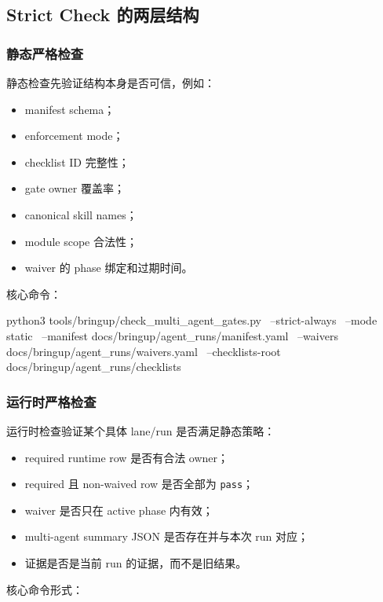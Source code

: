 \documentclass[UTF8,11pt,a4paper]{ctexart}
\begin{document}
\subsection{Strict Check 的两层结构}

\subsubsection{静态严格检查}

静态检查先验证结构本身是否可信，例如：

\begin{itemize}
  \item manifest schema；
  \item enforcement mode；
  \item checklist ID 完整性；
  \item gate owner 覆盖率；
  \item canonical skill names；
  \item module scope 合法性；
  \item waiver 的 phase 绑定和过期时间。
\end{itemize}

核心命令：

\begin{CodeBlock}
python3 tools/bringup/check_multi_agent_gates.py \
  --strict-always \
  --mode static \
  --manifest docs/bringup/agent_runs/manifest.yaml \
  --waivers docs/bringup/agent_runs/waivers.yaml \
  --checklists-root docs/bringup/agent_runs/checklists
\end{CodeBlock}

\subsubsection{运行时严格检查}

运行时检查验证某个具体 lane/run 是否满足静态策略：

\begin{itemize}
  \item required runtime row 是否有合法 owner；
  \item required 且 non-waived row 是否全部为 \texttt{pass}；
  \item waiver 是否只在 active phase 内有效；
  \item multi-agent summary JSON 是否存在并与本次 run 对应；
  \item 证据是否是当前 run 的证据，而不是旧结果。
\end{itemize}

核心命令形式：
\end{document}
